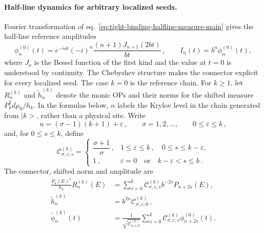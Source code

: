 \documentclass[a4paper,11pt]{article}
\def\ket#1{|#1>}%
\def\dd{d}%
\def\ii{i}%
\def\ee{e}%
\theoremstyle{definition}
\theoremstyle{remark}
\newcommand{\ket}[1]{|#1\rangle}
\newcommand{\dd}{\mathrm d}
\newcommand{\ii}{\mathrm i}
\newcommand{\ee}{\mathrm e}
\newcommand{\tphi}{\widetilde\phi}
\newcommand{\thh}{\widetilde h}
\begin{document}
\paragraph{Half-line dynamics for arbitrary localized seeds.}
Fourier transformation of eq.~\eqref{eq:tight-binding-halfline-measure-main}
gives the half-line reference amplitudes
\begin{equation}
   \phi_n^{(0)}(t)=
   \ee^{-\ii at}(-\ii)^n\frac{(n+1)J_{n+1}(2bt)}{bt}\,,
   \qquad I_n(t)=b^n\phi_n^{(0)}(t),
   \label{eq:tight-binding-reference-amplitudes-main}
\end{equation}
where \(J_\nu\) is the Bessel function of the first kind and the value at
\(t=0\) is understood by continuity. The Chebyshev structure makes the connector explicit for every localized
seed.  The case \(k=0\) is the reference chain.  For \(k\ge1\), let
\(R_n^{(k)}\) and \(\thh_n^{(k)}\) denote the monic OPs and their norms
for the shifted measure \(P_k^2\dd\mu_0/h_k\).  In the formulas below,
\(n\) labels the Krylov level in the chain generated from \(\ket k\),
rather than a physical site.  Write
\begin{equation}
   n=(\sigma-1)(k+1)+\varepsilon\,,
   \qquad \sigma=1,2,\ldots,
   \qquad 0\le\varepsilon\le k\,,
   \label{eq:tight-binding-block-decomposition-main}
\end{equation}
and, for \(0\le s\le k\), define
\begin{equation}
   \mathcal C_{\sigma,\varepsilon;s}^{(k)}=
   \begin{cases}
      \dfrac{\sigma+1}{\sigma}\,,
      &1\le\varepsilon\le k\,,
       \quad 0\le s\le k-\varepsilon,\\[6pt]
      1\,,
      &\varepsilon=0
       \quad\text{or}\quad k-\varepsilon<s\le k\,.
   \end{cases}
   \label{eq:tight-binding-all-k-coefficients-main}
\end{equation}
The connector, shifted norm and amplitude are
\begin{equation}
\begin{aligned}
   \frac{P_k(E)^2}{h_k}R_n^{(k)}(E)
   &=\sum_{s=0}^{k}
   \mathcal C_{\sigma,\varepsilon;s}^{(k)}
   b^{-2s}P_{n+2s}(E),\\
   \thh_n^{(k)}
   &=b^{2n}\mathcal C_{\sigma,\varepsilon;0}^{(k)}\,,\\
   \tphi_n^{(k)}(t)
   &=\frac{1}{\sqrt{\mathcal C_{\sigma,\varepsilon;0}^{(k)}}}
   \sum_{s=0}^{k}
   \mathcal C_{\sigma,\varepsilon;s}^{(k)}
   \phi_{n+2s}^{(0)}(t).
   \label{eq:tight-binding-all-k-connector-main}
\end{aligned}
\end{equation}
\end{document}
